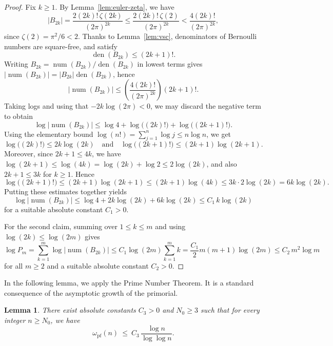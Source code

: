 \documentclass[12pt]{amsart}
\theoremstyle{plain}
\newtheorem{lemma}[theorem]{Lemma}
\theoremstyle{definition}
\DeclareMathOperator{\num}{num}
\DeclareMathOperator{\den}{den}
\newcommand{\omegapf}{\omega_{\mathrm{pf}}} %
\begin{document}
\begin{proof}
Fix $k\ge 1$.
By Lemma~\ref{lem:euler-zeta}, we have
\[
|B_{2k}|=\frac{2(2k)!\,\zeta(2k)}{(2\pi)^{2k}}
\le \frac{2(2k)!\,\zeta(2)}{(2\pi)^{2k}}
< \frac{4(2k)!}{(2\pi)^{2k}},
\]
since $\zeta(2)=\pi^2/6<2$.
Thanks to Lemma~\ref{lem:vsc}, denominators of Bernoulli numbers are square-free, and satisfy
\[
\den(B_{2k})\le (2k+1)!.
\]
Writing $B_{2k}=\num(B_{2k})/\den(B_{2k})$ in lowest terms gives
$|\num(B_{2k})|=|B_{2k}|\den(B_{2k})$, hence
\[
|\num(B_{2k})|
\le \left(\frac{4(2k)!}{(2\pi)^{2k}}\right) (2k+1)!.
\]
Taking logs and using that $-2k\log(2\pi)<0$, we may discard the negative term to obtain
\[
\log\bigl|\num(B_{2k})\bigr|
\le \log 4 + \log\bigl((2k)!\bigr) + \log\bigl((2k+1)!\bigr).
\]
Using the elementary bound $\log(n!)=\sum_{j=1}^n \log j \le n\log n$, we get
\[
\log\bigl((2k)!\bigr)\le 2k\log(2k)
\quad\text{and}\quad
\log\bigl((2k+1)!\bigr)\le (2k+1)\log(2k+1).
\]
Moreover, since $2k+1\le 4k$, we have $\log(2k+1)\le \log(4k)=\log(2k)+\log 2\le 2\log(2k)$,
and also $2k+1\le 3k$ for $k\ge 1$. Hence
\[
\log\bigl((2k+1)!\bigr)\le (2k+1)\log(2k+1)
\le (2k+1)\log(4k)
\le 3k\cdot 2\log(2k)=6k\log(2k).
\]
Putting these estimates together yields
\[
\log\bigl|\num(B_{2k})\bigr|
\le \log 4 + 2k\log(2k) + 6k\log(2k)
\le C_1\,k\log(2k)
\]
for a suitable absolute constant $C_1>0$.

For the second claim, summing over $1\le k\le m$ and using $\log(2k)\le \log(2m)$ gives
\[
\log P_m=\sum_{k=1}^m \log\bigl|\num(B_{2k})\bigr|
\le C_1 \log(2m)\sum_{k=1}^m k
= \frac{C_1}{2}m(m+1)\log(2m)
\le C_2\,m^2\log m
\]
for all $m\ge 2$ and a suitable absolute constant $C_2>0$.
\end{proof}

In the following lemma, we apply the Prime Number Theorem.
It is a standard consequence of the asymptotic growth of the primorial.

\begin{lemma}\label{lem:omega-bound}
There exist absolute constants $C_3>0$ and $N_0\ge 3$ such that for every integer
$n\ge N_0$, we have
\[
\omegapf(n)\ \le\ C_3\,\frac{\log n}{\log\log n}.
\]
\end{lemma}
\end{document}

